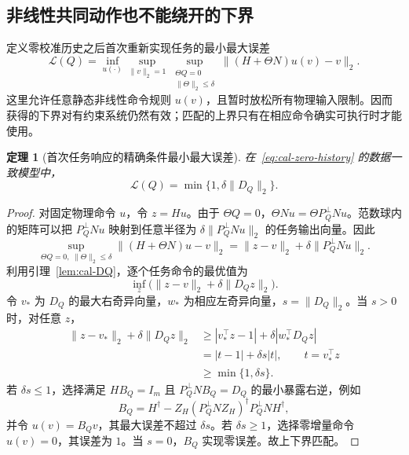 \documentclass[11pt,a4paper]{article}
\numberwithin{equation}{section}
\newtheorem{theorem}{定理}[section]
\theoremstyle{definition}
\begin{document}
\subsection{非线性共同动作也不能绕开的下界}

定义零校准历史之后首次重新实现任务的最小最大误差
\begin{equation}
  \mathcal L(Q)=
  \inf_{u(\cdot)}
  \sup_{\|v\|_2=1}
  \sup_{\substack{\Theta Q=0\\\|\Theta\|_2\le\delta}}
  \|(H+\Theta N)u(v)-v\|_2 .
  \label{eq:cal-first-loss}
\end{equation}
这里允许任意静态非线性命令规则 $u(v)$，且暂时放松所有物理输入限制。因而获得的下界对有约束系统仍然有效；匹配的上界只有在相应命令确实可执行时才能使用。

\begin{theorem}[首次任务响应的精确条件最小最大误差]
\label{thm:cal-first-loss}
在~\eqref{eq:cal-zero-history} 的数据一致模型中，
\begin{equation}
  \boxed{\mathcal L(Q)=
  \min\{1,\delta\|D_Q\|_2\}.}
  \label{eq:cal-first-exact}
\end{equation}
\end{theorem}

\begin{proof}
对固定物理命令 $u$，令 $z=Hu$。由于 $\Theta Q=0$，$\Theta Nu=\Theta P_Q^\perp Nu$。范数球内的矩阵可以把 $P_Q^\perp Nu$ 映射到任意半径为 $\delta\|P_Q^\perp Nu\|_2$ 的任务输出向量。因此
\begin{equation}
  \sup_{\Theta Q=0,\;\|\Theta\|_2\le\delta}
  \|(H+\Theta N)u-v\|_2
  =
  \|z-v\|_2+\delta\|P_Q^\perp Nu\|_2 .
  \label{eq:cal-task-ball}
\end{equation}
利用引理~\ref{lem:cal-DQ}，逐个任务命令的最优值为
\begin{equation}
  \inf_z\big(\|z-v\|_2+\delta\|D_Qz\|_2\big).
  \label{eq:cal-task-prox}
\end{equation}
令 $v_*$ 为 $D_Q$ 的最大右奇异向量，$w_*$ 为相应左奇异向量，$s=\|D_Q\|_2$。当 $s>0$ 时，对任意 $z$，
\begin{align}
  \|z-v_*\|_2+\delta\|D_Qz\|_2
  &\ge
  |v_*^\top z-1|
  +\delta|w_*^\top D_Qz|\\
  &=
  |t-1|+\delta s|t|,
  \qquad t=v_*^\top z\\
  &\ge\min\{1,\delta s\}.
\end{align}
若 $\delta s\le1$，选择满足 $HB_Q=I_m$ 且 $P_Q^\perp NB_Q=D_Q$ 的最小暴露右逆，例如
\begin{equation}
  B_Q=
  H^\dagger-
  Z_H(P_Q^\perp NZ_H)^\dagger
  P_Q^\perp NH^\dagger ,
  \label{eq:cal-BQ}
\end{equation}
并令 $u(v)=B_Qv$，其最大误差不超过 $\delta s$。若 $\delta s\ge1$，选择零增量命令 $u(v)=0$，其误差为 $1$。当 $s=0$，$B_Q$ 实现零误差。故上下界匹配。
\end{proof}
\end{document}
